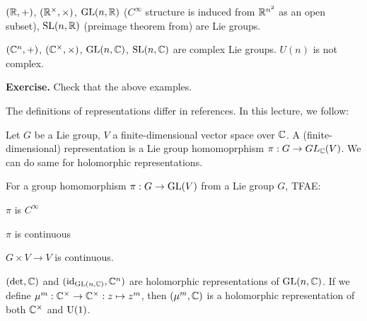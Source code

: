 \documentclass{../../small}
\begin{document}
\begin{ex}
$(\mathbb{R},+)$, $(\mathbb{R}^\times,\times)$, $\mathrm{GL}(n,\mathbb{R})$ ($C^\infty$ structure is induced from $\mathbb{R}^{n^2}$ as an open subset), $\mathrm{SL}(n,\mathbb{R})$ (preimage theorem from) are Lie groups.
\end{ex}
\begin{ex}
$(\mathbb{C}^n,+)$, $(\mathbb{C}^\times,\times)$, $\mathrm{GL}(n,\mathbb{C})$, $\mathrm{SL}(n,\mathbb{C})$ are complex Lie groups.
$U(n)$ is not complex.
\end{ex}

\textbf{Exercise.} Check that the above examples.


\bigskip



The definitions of representations differ in references.
In this lecture, we follow:
\begin{defn}
Let $G$ be a Lie group, $V$ a finite-dimensional vector space over $\mathbb{C}$.
A (finite-dimensional) representation is a Lie group homomoprphism $\pi:G\to GL_{\mathbb{C}}(V)$.
We can do same for holomorphic representations.
\end{defn}
\begin{rmk}
For a group homomorphism $\pi:G\to\mathrm{GL}(V)$ from a Lie group $G$, TFAE:
\begin{parts}
	\item $\pi$ is $C^\infty$
	\item $\pi$ is continuous
	\item $G\times V\to V$ is continuous.
\end{parts}
\end{rmk}


\begin{ex}
$(\det,\mathbb{C})$ and $(\operatorname{id}_{\mathrm{GL}(n,\mathbb{C})},\mathbb{C}^n)$ are holomorphic representations of $\mathrm{GL}(n,\mathbb{C})$.
If we define $\mu^m:\mathbb{C}^\times\to\mathbb{C}^\times:z\mapsto z^m$, then $(\mu^m,\mathbb{C})$ is a holomorphic representation of both $\mathbb{C}^\times$ and $\mathrm{U}(1)$.
\end{ex}
\end{document}
